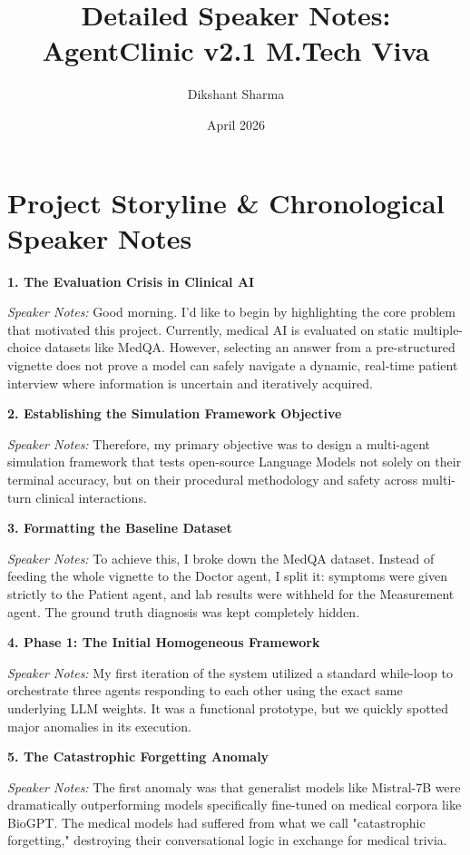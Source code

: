 \documentclass[12pt]{article}
\title{Detailed Speaker Notes: AgentClinic v2.1 M.Tech Viva}
\author{Dikshant Sharma}
\date{April 2026}
\begin{document}
\maketitle

\section*{Project Storyline \& Chronological Speaker Notes}

\begin{description}

\item \textbf{1. The Evaluation Crisis in Clinical AI}
\par\textit{Speaker Notes:} Good morning. I'd like to begin by highlighting the core problem that motivated this project. Currently, medical AI is evaluated on static multiple-choice datasets like MedQA. However, selecting an answer from a pre-structured vignette does not prove a model can safely navigate a dynamic, real-time patient interview where information is uncertain and iteratively acquired.

\item \textbf{2. Establishing the Simulation Framework Objective}
\par\textit{Speaker Notes:} Therefore, my primary objective was to design a multi-agent simulation framework that tests open-source Language Models not solely on their terminal accuracy, but on their procedural methodology and safety across multi-turn clinical interactions.

\item \textbf{3. Formatting the Baseline Dataset}
\par\textit{Speaker Notes:} To achieve this, I broke down the MedQA dataset. Instead of feeding the whole vignette to the Doctor agent, I split it: symptoms were given strictly to the Patient agent, and lab results were withheld for the Measurement agent. The ground truth diagnosis was kept completely hidden.

\item \textbf{4. Phase 1: The Initial Homogeneous Framework}
\par\textit{Speaker Notes:} My first iteration of the system utilized a standard while-loop to orchestrate three agents responding to each other using the exact same underlying LLM weights. It was a functional prototype, but we quickly spotted major anomalies in its execution. 

\item \textbf{5. The Catastrophic Forgetting Anomaly}
\par\textit{Speaker Notes:} The first anomaly was that generalist models like Mistral-7B were dramatically outperforming models specifically fine-tuned on medical corpora like BioGPT. The medical models had suffered from what we call "catastrophic forgetting," destroying their conversational logic in exchange for medical trivia.


\end{description}
\end{document}
